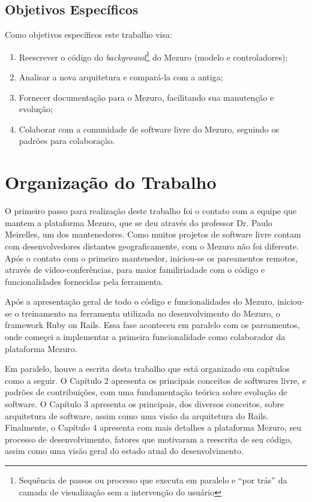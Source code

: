\subsection{Objetivos Específicos}

Como objetivos específicos este trabalho visa:

\begin{enumerate}
\item Reescrever o código do \textit{background}\footnote{Sequência de passos ou processo que executa em paralelo e ``por trás'' da camada de visualização sem a intervenção do usuário} do Mezuro (modelo e controladores);
\item Analisar a nova arquitetura e compará-la com a antiga;
\item Fornecer documentação para o Mezuro, facilitando sua manutenção e evolução;
\item Colaborar com a comunidade de software livre do Mezuro, seguindo os padrões para colaboração.
\end{enumerate}

\section{Organização do Trabalho}

O primeiro passo para realização deste trabalho foi o contato com a equipe que mantem a plataforma Mezuro, que se deu através do professor Dr. Paulo Meirelles, um dos mantenedores. Como muitos projetos de software livre contam com desenvolvedores distantes geograficamente, com o Mezuro não foi diferente. Após o contato com o primeiro mantenedor, iniciou-se os pareamentos remotos, através de vídeo-conferências, para maior familiriadade com o código e funcionalidades fornecidas pela ferramenta.

Após a apresentação geral de todo o código e funcionalidades do Mezuro, iniciou-se o treinamento na ferramenta utilizada no desenvolvimento do Mezuro, o framework Ruby on Rails. Essa fase aconteceu em paralelo com os pareamentos, onde começei a implementar a primeira funcionalidade como colaborador da plataforma Mezuro.

Em paralelo, houve a escrita desta trabalho que está organizado em capítulos como a seguir. O Capítulo 2 apresenta os principais conceitos de softwares livre, e padrões de contribuições, com uma fundamentação teórica sobre evolução de software. O Capítulo 3 apresenta os principais, dos diversos conceitos, sobre arquitetura de software, assim como uma visão da arquitetura do Rails. Finalmente, o Capítulo 4 apresenta com mais detalhes a plataforma Mezuro, seu processo de desenvolvimento, fatores que motivaram a reescrita de seu código, assim como uma visão geral do estado atual do desenvolvimento.

